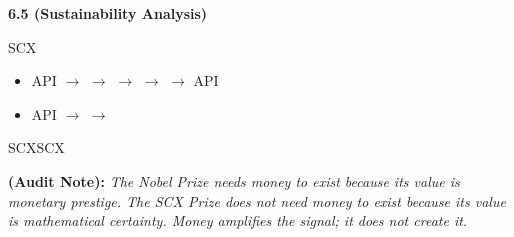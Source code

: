 \documentclass[12pt,a4paper]{article}
\theoremstyle{remark}
\newcommand{\auditnote}[1]{%
    \medskip\noindent
    \textbf{ (Audit Note):} \textit{#1}%
}
\begin{document}
\noindent
\textbf{6.5  (Sustainability Analysis)}

SCX
\begin{itemize}
    \item API $\to$  $\to$  $\to$  $\to$  $\to$ API
\end{itemize}


\begin{itemize}
    \item API $\to$  $\to$ 
\end{itemize}

SCXSCX

\auditnote{The Nobel Prize needs money to exist because its value is monetary prestige. The SCX Prize does not need money to exist because its value is mathematical certainty. Money amplifies the signal; it does not create it.}

\newpage

\section*{}
\label{sec:epilogue}
\end{document}
